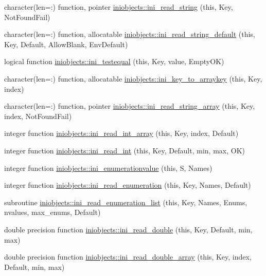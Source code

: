 \begin{DoxyCompactItemize}
\item 
character(len=\+:) function, pointer \mbox{\hyperlink{namespaceiniobjects_af8362fa0f894e89d84f084ec08dca575}{iniobjects\+::ini\+\_\+read\+\_\+string}} (this, Key, Not\+Found\+Fail)
\item 
character(len=\+:) function, allocatable \mbox{\hyperlink{namespaceiniobjects_a7a7f7950cdd1ae3e2c9e977fb7ce87a7}{iniobjects\+::ini\+\_\+read\+\_\+string\+\_\+default}} (this, Key, Default, Allow\+Blank, Env\+Default)
\item 
logical function \mbox{\hyperlink{namespaceiniobjects_aef66a5c954f63ad0935b093198bfde8a}{iniobjects\+::ini\+\_\+testequal}} (this, Key, value, Empty\+OK)
\item 
character(len=\+:) function, allocatable \mbox{\hyperlink{namespaceiniobjects_aaf02b1dc48d8287253cf7bf134cc3a73}{iniobjects\+::ini\+\_\+key\+\_\+to\+\_\+arraykey}} (this, Key, index)
\item 
character(len=\+:) function, pointer \mbox{\hyperlink{namespaceiniobjects_ad97700ba84c737601d0ad383c27f1af4}{iniobjects\+::ini\+\_\+read\+\_\+string\+\_\+array}} (this, Key, index, Not\+Found\+Fail)
\item 
integer function \mbox{\hyperlink{namespaceiniobjects_a83bc292e9738adde7e94413ff8fb38d7}{iniobjects\+::ini\+\_\+read\+\_\+int\+\_\+array}} (this, Key, index, Default)
\item 
integer function \mbox{\hyperlink{namespaceiniobjects_aca470402b1c4d58754217c0095202c84}{iniobjects\+::ini\+\_\+read\+\_\+int}} (this, Key, Default, min, max, OK)
\item 
integer function \mbox{\hyperlink{namespaceiniobjects_a64b8c91a4222e931e13741a44ef55497}{iniobjects\+::ini\+\_\+enumerationvalue}} (this, S, Names)
\item 
integer function \mbox{\hyperlink{namespaceiniobjects_a6dcfc3786b1d30b745d72bd0ec892ba4}{iniobjects\+::ini\+\_\+read\+\_\+enumeration}} (this, Key, Names, Default)
\item 
subroutine \mbox{\hyperlink{namespaceiniobjects_abd02c75afc73274d508c0c1eb3cecca5}{iniobjects\+::ini\+\_\+read\+\_\+enumeration\+\_\+list}} (this, Key, Names, Enums, nvalues, max\+\_\+enums, Default)
\item 
double precision function \mbox{\hyperlink{namespaceiniobjects_ac283e4d44c96fe341620c0ca70e55adb}{iniobjects\+::ini\+\_\+read\+\_\+double}} (this, Key, Default, min, max)
\item 
double precision function \mbox{\hyperlink{namespaceiniobjects_a9d2368de438cf3dd261c801000672239}{iniobjects\+::ini\+\_\+read\+\_\+double\+\_\+array}} (this, Key, index, Default, min, max)

\end{DoxyCompactItemize}
